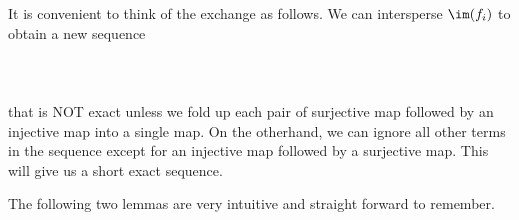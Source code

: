 \documentclass[a4paper]{article}
\begin{document}
It is convenient to think of the exchange as follows. We can intersperse $\im(f_i)$ to obtain a new sequence \\~\\
\\~\\
that is NOT exact unless we fold up each pair of surjective map followed by an injective map into a single map. On the otherhand, we can ignore all other terms in the sequence except for an injective map followed by a surjective map. This will give us a short exact sequence. 

The following two lemmas are very intuitive and straight forward to remember. 
\end{document}
